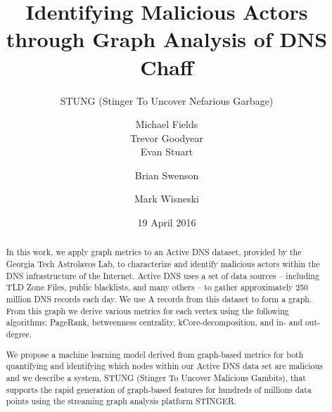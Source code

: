 \documentclass{acm_proc_article-sp}
\begin{document}

\title{Identifying Malicious Actors through Graph Analysis of DNS Chaff}
\subtitle{ STUNG (Stinger To Uncover Nefarious Garbage)}

\author{
\alignauthor
Michael Fields\\
\alignauthor
Trevor Goodyear\\
\alignauthor
Evan Stuart\\
\and %
\alignauthor
Brian Swenson\\
\and %
\alignauthor
Mark Wisneski\\
}

\date{19 April 2016}


\maketitle
\begin{abstract}
In this work, we apply graph metrics to an Active DNS dataset, provided by the Georgia Tech Astrolavos Lab, to characterize and identify malicious actors within the DNS infrastructure of the Internet. Active DNS uses a set of data sources -- including TLD Zone Files, public blacklists, and many others -- to gather approximately 250 million DNS records each day. We use A records from this dataset to form a graph. From this graph we derive various metrics for each vertex using the following algorithms: PageRank, betweenness centrality, kCore-decomposition, and in- and out-degree.

We propose a machine learning model derived from graph-based metrics for both quantifying and identifying which nodes within our Active DNS data set are malicious and we describe a system, STUNG (Stinger To Uncover Malicious Gambits), that supports the rapid generation of graph-based features for hundreds of millions data points using the streaming graph analysis platform STINGER.
\end{abstract}
\end{document}
